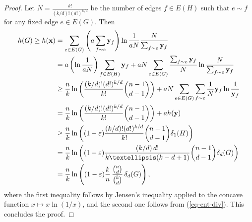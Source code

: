 \documentclass[10pt,a4paper]{amsart}
\renewcommand{\epsilon}{\ensuremath\varepsilon}
\newcommand{\fpm}{\mathbf{x}}
\newcommand{\fpmy}{\mathbf{y}}
\begin{document}
\begin{proof}
    Let $N=\frac{k!}{(k/d)!(d!)^{k/d}}$ be the number of edges $f\in E(H)$ such that $e\sim f$ for any fixed edge $e\in E(G)$. Then
    \begin{align*}
        h(G) \ge h(\fpm) &= \sum_{e\in E(G)}\Bigg( a\sum_{f\sim e}\fpmy_f\Bigg)\ln\frac{1}{aN }\frac{N }{\sum_{f\sim e}\fpmy_f} \\
        &= a\left(\ln\frac{1}{aN}\right)\sum_{f\in E(H)}\fpmy_f + aN\sum_{e\in E(G)} \frac{\sum_{f\sim e}\fpmy_f }{N}\ln\frac{N }{\sum_{f\sim e}\fpmy_f} \\
        &\ge \frac{n}{k}\ln\left(\frac{(k/d)!(d!)^{k/d}}{k!}\binom{n-1}{d-1}\right) + aN\sum_{e\in E(G)}\sum_{f\sim e}\frac{1}{N }\fpmy_f\ln\frac{1}{\fpmy_f} \\
        &= \frac{n}{k}\ln\left(\frac{(k/d)!(d!)^{k/d}}{k!}\binom{n-1}{d-1}\right) + ah(\fpmy) \\
        &\ge \frac{n}{k}\ln\left((1-\epsilon)\frac{(k/d)!(d!)^{k/d}}{k!}\binom{n-1}{d-1}\delta_1(H)\right) \\
        &= \frac{n }{k }\ln\left((1-\epsilon)\frac{(k/d)\,d!}{k\dots(k-d+1)}\binom{n-1}{d-1}\delta_d(G)\right) \\
        &= \frac{n}{k}\ln\left((1-\epsilon)\frac{k}{n}\,\frac{\binom{n}{d}}{\binom{k}{d}}\,\delta_d(G)\right),
    \end{align*}
    where the first inequality follows by Jensen's inequality applied to the concave function $x\mapsto x\ln(1/x)$, and the second one follows from (\ref{eq-ent-div}). This concludes the proof.
\end{proof}
\end{document}

